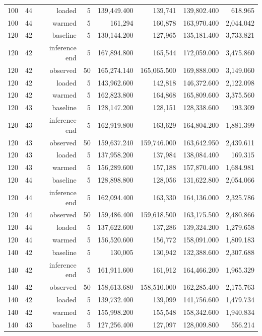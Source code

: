 \documentclass[10pt,a4paper]{article}
\begin{document}
\begin{longtable}{@{}lrrrrrrr@{}}
100 & 44 & loaded & 5 & 139,449.400 & 139,741 & 139,802.400 & 618.965 \\
100 & 44 & warmed & 5 & 161,294 & 160,878 & 163,970.400 & 2,044.042 \\
120 & 42 & baseline & 5 & 130,144.200 & 127,965 & 135,181.400 & 3,733.821 \\
120 & 42 & inference end & 5 & 167,894.800 & 165,544 & 172,059.000 & 3,475.860 \\
120 & 42 & observed & 50 & 165,274.140 & 165,065.500 & 169,888.000 & 3,149.060 \\
120 & 42 & loaded & 5 & 143,962.600 & 142,818 & 146,372.600 & 2,122.098 \\
120 & 42 & warmed & 5 & 162,823.800 & 164,868 & 165,809.600 & 3,375.560 \\
120 & 43 & baseline & 5 & 128,147.200 & 128,151 & 128,338.600 & 193.309 \\
120 & 43 & inference end & 5 & 162,919.800 & 163,629 & 164,804.200 & 1,881.399 \\
120 & 43 & observed & 50 & 159,637.240 & 159,746.000 & 163,642.950 & 2,439.611 \\
120 & 43 & loaded & 5 & 137,958.200 & 137,984 & 138,084.400 & 169.315 \\
120 & 43 & warmed & 5 & 156,289.600 & 157,188 & 157,870.400 & 1,684.981 \\
120 & 44 & baseline & 5 & 128,898.800 & 128,056 & 131,622.800 & 2,054.066 \\
120 & 44 & inference end & 5 & 162,094.400 & 163,330 & 164,136.000 & 2,325.786 \\
120 & 44 & observed & 50 & 159,486.400 & 159,618.500 & 163,175.500 & 2,480.866 \\
120 & 44 & loaded & 5 & 137,622.600 & 137,286 & 139,324.200 & 1,279.658 \\
120 & 44 & warmed & 5 & 156,520.600 & 156,772 & 158,091.000 & 1,809.183 \\
140 & 42 & baseline & 5 & 130,005 & 130,942 & 132,388.600 & 2,307.688 \\
140 & 42 & inference end & 5 & 161,911.600 & 161,912 & 164,466.200 & 1,965.329 \\
140 & 42 & observed & 50 & 158,613.680 & 158,510.000 & 162,285.400 & 2,175.763 \\
140 & 42 & loaded & 5 & 139,732.400 & 139,099 & 141,756.600 & 1,479.734 \\
140 & 42 & warmed & 5 & 155,998.200 & 155,548 & 158,342.600 & 1,940.834 \\
140 & 43 & baseline & 5 & 127,256.400 & 127,097 & 128,009.800 & 556.214 \\

\end{longtable}
\end{document}
